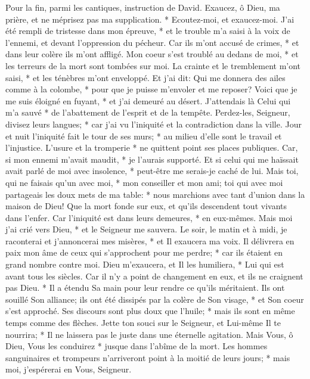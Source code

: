 Pour la fin, parmi les cantiques, instruction de David.
Exaucez, ô Dieu, ma prière, et ne méprisez pas ma supplication. *
Ecoutez-moi, et exaucez-moi. J'ai été rempli de tristesse dans mon épreuve, * et le trouble m'a saisi
à la voix de l'ennemi, et devant l'oppression du pécheur. Car ils m'ont accusé de crimes, * et dans leur colère ils m'ont affligé.
Mon coeur s'est troublé au dedans de moi, * et les terreurs de la mort sont tombées sur moi.
La crainte et le tremblement m'ont saisi, * et les ténèbres m'ont enveloppé.
Et j'ai dit: Qui me donnera des ailes comme à la colombe, * pour que je puisse m'envoler et me reposer?
Voici que je me suis éloigné en fuyant, * et j'ai demeuré au désert.
J'attendais là Celui qui m'a sauvé * de l'abattement de l'esprit et de la tempête.
Perdez-les, Seigneur, divisez leurs langues; * car j'ai vu l'iniquité et la contradiction dans la ville.
Jour et nuit l'iniquité fait le tour de ses murs; * au milieu d'elle sont le travail
et l'injustice. L'usure et la tromperie * ne quittent point ses places publiques.
Car, si mon ennemi m'avait maudit, * je l'aurais supporté. Et si celui qui me haïssait avait parlé de moi avec insolence, * peut-être me serais-je caché de lui.
Mais toi, qui ne faisais qu'un avec moi, * mon conseiller et mon ami;
toi qui avec moi partageais les doux mets de ma table: * nous marchions avec tant d'union dans la maison de Dieu!
Que la mort fonde sur eux, et qu'ils descendent tout vivants dans l'enfer. Car l'iniquité est dans leurs demeures, * en eux-mêmes.
Mais moi j'ai crié vers Dieu, * et le Seigneur me sauvera.
Le soir, le matin et à midi, je raconterai et j'annoncerai mes misères, * et Il exaucera ma voix.
Il délivrera en paix mon âme de ceux qui s'approchent pour me perdre; * car ils étaient en grand nombre contre moi.
Dieu m'exaucera, et Il les humiliera, * Lui qui est avant tous les siècles. Car il n'y a point de changement en eux, et ils ne craignent pas Dieu. *
Il a étendu Sa main pour leur rendre ce qu'ils méritaient. Ils ont souillé Son alliance;
ils ont été dissipés par la colère de Son visage, * et Son coeur s'est approché. Ses discours sont plus doux que l'huile; * mais ils sont en même temps comme des flèches.
Jette ton souci sur le Seigneur, et Lui-même Il te nourrira; * Il ne laissera pas le juste dans une éternelle agitation.
Mais Vous, ô Dieu, Vous les conduirez * jusque dans l'abîme de la mort. Les hommes sanguinaires et trompeurs n'arriveront point à la moitié de leurs jours; * mais moi, j'espérerai en Vous, Seigneur.

